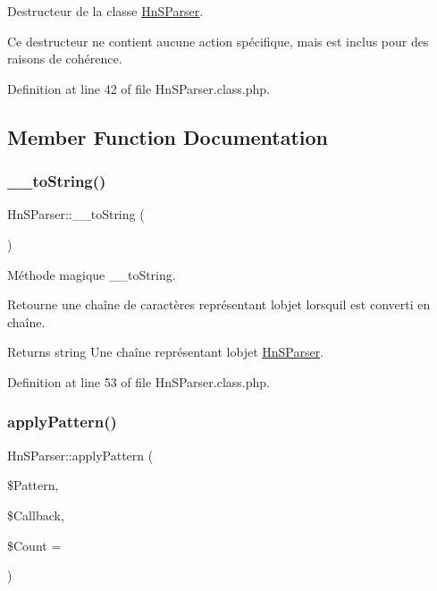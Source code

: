 Destructeur de la classe \hyperlink{class_hn_s_parser}{Hn\+S\+Parser}.

Ce destructeur ne contient aucune action spécifique, mais est inclus pour des raisons de cohérence. 

Definition at line 42 of file Hn\+S\+Parser.\+class.\+php.



\subsection{Member Function Documentation}
\mbox{\label{class_hn_s_parser_a54c9843058539b99d6695a3136184150}} 
\subsubsection{\texorpdfstring{\+\_\+\+\_\+to\+String()}{\_\_toString()}}
{\footnotesize\ttfamily Hn\+S\+Parser\+::\+\_\+\+\_\+to\+String (\begin{DoxyParamCaption}{ }\end{DoxyParamCaption})}

Méthode magique \+\_\+\+\_\+to\+String.

Retourne une chaîne de caractères représentant l\textquotesingle{}objet lorsqu\textquotesingle{}il est converti en chaîne.

\begin{DoxyReturn}{Returns}
string Une chaîne représentant l\textquotesingle{}objet \hyperlink{class_hn_s_parser}{Hn\+S\+Parser}. 
\end{DoxyReturn}


Definition at line 53 of file Hn\+S\+Parser.\+class.\+php.

\mbox{\label{class_hn_s_parser_af1819b45d1b6e1351bf027579db4a1e5}} 
\subsubsection{\texorpdfstring{apply\+Pattern()}{applyPattern()}}
{\footnotesize\ttfamily Hn\+S\+Parser\+::apply\+Pattern (\begin{DoxyParamCaption}\item[{}]{\$\+Pattern,  }\item[{}]{\$\+Callback,  }\item[{}]{\$\+Count = {} }\end{DoxyParamCaption})\hspace{0.3cm}{\ttfamily [protected]}}

